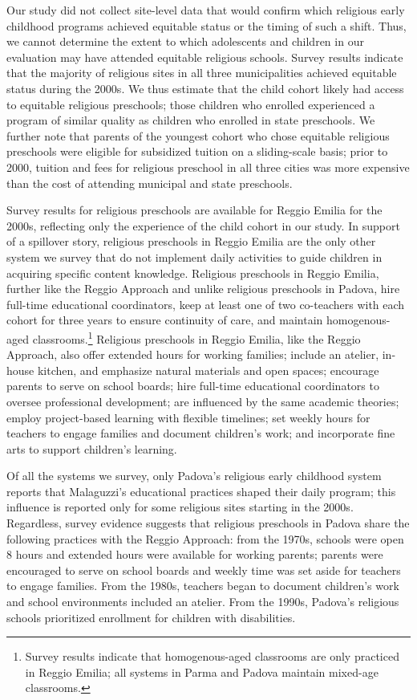 Our study did not collect site-level data that would confirm which religious early childhood programs achieved equitable status or the timing of such a shift. Thus, we cannot determine the extent to which adolescents and children in our evaluation may have attended equitable religious schools. Survey results indicate that the majority of religious sites in all three municipalities achieved equitable status during the 2000s. We thus estimate that the child cohort likely had access to equitable religious preschools; those children who enrolled experienced a program of similar quality as children who enrolled in state preschools. We further note that parents of the youngest cohort who chose equitable religious preschools were eligible for subsidized tuition on a sliding-scale basis; prior to 2000, tuition and fees for religious preschool in all three cities was more expensive than the cost of attending municipal and state preschools.

Survey results for religious preschools are available for Reggio Emilia for the 2000s, reflecting only the experience of the child cohort in our study. In support of a spillover story, religious preschools in Reggio Emilia are the only other system we survey that do not implement daily activities to guide children in acquiring specific content knowledge. Religious preschools in Reggio Emilia, further like the Reggio Approach and unlike religious preschools in Padova, hire full-time educational coordinators, keep at least one of two co-teachers with each cohort for three years to ensure continuity of care, and maintain homogenous-aged classrooms.\footnote{Survey results indicate that homogenous-aged classrooms are only practiced in Reggio Emilia; all systems in Parma and Padova maintain mixed-age classrooms.} Religious preschools in Reggio Emilia, like the Reggio Approach, also offer extended hours for working families; include an atelier, in-house kitchen, and emphasize natural materials and open spaces; encourage parents to serve on school boards; hire full-time educational coordinators to oversee professional development; are influenced by the same academic theories; employ project-based learning with flexible timelines; set weekly hours for teachers to engage families and document children's work; and incorporate fine arts to support children's learning. 

Of all the systems we survey, only Padova's religious early childhood system reports that Malaguzzi's educational practices shaped their daily program; this influence is reported only for some religious sites starting in the 2000s. Regardless, survey evidence suggests that religious preschools in Padova share the following practices with the Reggio Approach: from the 1970s, schools were open 8 hours and extended hours were available for working parents; parents were encouraged to serve on school boards and weekly time was set aside for teachers to engage families. From the 1980s, teachers began to document children's work and school environments included an atelier. From the 1990s, Padova's religious schools prioritized enrollment for children with disabilities. 

